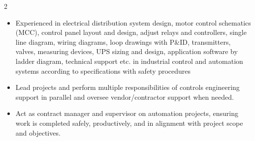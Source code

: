 \documentclass[10pt,a4paper,ragged2e,withhyper]{altacv}
\begin{document}
\begin{paracol}{2}
\divider
{}
\begin{itemize}
\item Experienced in electrical distribution system design, motor control schematics (MCC), control panel layout and design, adjust relays and controllers, single line diagram, wiring diagrams, loop drawings with P\&ID, transmitters, valves, measuring devices, UPS sizing and design, application software by ladder diagram, technical support etc. in industrial control and automation systems according to specifications with safety procedures
\item Lead projects and perform multiple responsibilities of controls engineering support in parallel and oversee vendor/contractor support when needed.

\item Act as contract manager and supervisor on automation projects, ensuring work is completed safely, productively, and in alignment with project scope and objectives.


\end{itemize}
\end{paracol}
\end{document}
